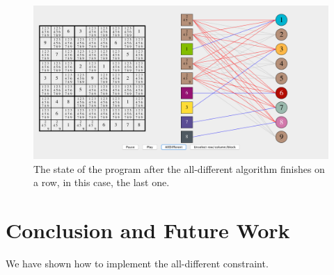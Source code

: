 \documentclass{l4proj}
\begin{document}
\begin{figure}[H]
\centering
\includegraphics[width=13.2cm]{screenshot.png}
\caption{The state of the program after the all-different algorithm finishes on a row, in this case, the last one.}
\end{figure}


%

\chapter{Conclusion and Future Work}
\label{conclusion}
We have shown how to implement the all-different constraint.
\end{document}
